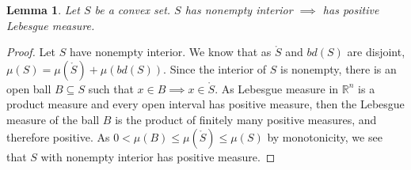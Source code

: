 \documentclass[12pt]{article}
\newcommand{\Comments}{1}
\newcommand{\mynote}[2]{\ifnum\Comments=1\textcolor{#1}{#2}\fi}
\newcommand{\jessie}[1]{\mynote{purple}{[JF: #1]}}
\newcommand{\reals}{\mathbb{R}}
\newcommand{\inter}[1]{\mathring{#1}}%
\newtheorem{lemma}{Lemma}
\begin{document}
\begin{lemma}\label{lem:pos-measure-iff-nonempty-int}
Let $S$ be a convex set.
$S$ has nonempty interior $\implies$ has positive Lebesgue measure.
\end{lemma}
\begin{proof}

	Let $S$ have nonempty interior.
	We know that as $\inter{S}$ and $bd(S)$ are disjoint, $\mu(S) = \mu(\inter{S}) + \mu(bd(S))$.
	Since the interior of $S$ is nonempty, there is an open ball $B \subseteq S$ such that $x \in B \implies x \in \inter S$.
	As Lebesgue measure in $\reals^n$ is a product measure and every open interval has positive measure, then the Lebesgue measure of the ball $B$ is the product of finitely many positive measures, and therefore positive.
	As $0 < \mu(B) \leq \mu(\inter S) \leq \mu(S)$ by monotonicity, we see that $S$ with nonempty interior has positive measure.
	
	
\end{proof}
\end{document}

